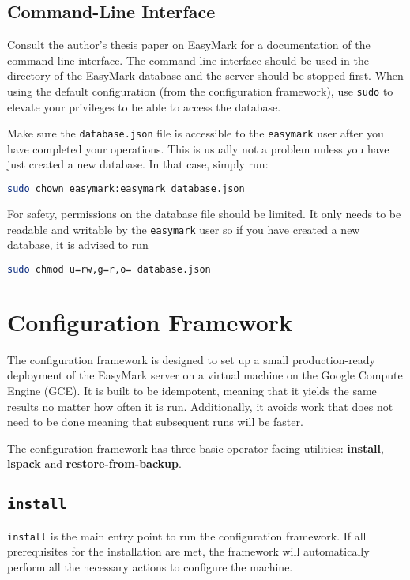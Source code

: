 \documentclass[12pt,a4paper]{report}
\begin{document}
	\section{Command-Line Interface}
	Consult the author's thesis paper on EasyMark for a documentation of the command-line interface. The command line interface should be used in the directory of the EasyMark database and the server should be stopped first. When using the default configuration (from the configuration framework), use \lstinline|sudo| to elevate your privileges to be able to access the database.

	Make sure the \lstinline|database.json| file is accessible to the \lstinline|easymark| user after you have completed your operations. This is usually not a problem unless you have just created a new database. In that case, simply run:

	\begin{lstlisting}[language=bash]
		sudo chown easymark:easymark database.json
	\end{lstlisting}

	For safety, permissions on the database file should be limited. It only needs to be readable and writable by the \lstinline|easymark| user so if you have created a new database, it is advised to run

	\begin{lstlisting}[language=bash]
		sudo chmod u=rw,g=r,o= database.json
	\end{lstlisting}

	\chapter{Configuration Framework}
	The configuration framework is designed to set up a small production-ready deployment of the EasyMark server on a virtual machine on the Google Compute Engine (GCE). It is built to be idempotent, meaning that it yields the same results no matter how often it is run. Additionally, it avoids work that does not need to be done meaning that subsequent runs will be faster.

	The configuration framework has three basic operator-facing utilities: \textbf{install}, \textbf{lspack} and \textbf{restore-from-backup}.

	\section{\lstinline|install|}
	\lstinline|install| is the main entry point to run the configuration framework. If all prerequisites for the installation are met, the framework will automatically perform all the necessary actions to configure the machine.
\end{document}
